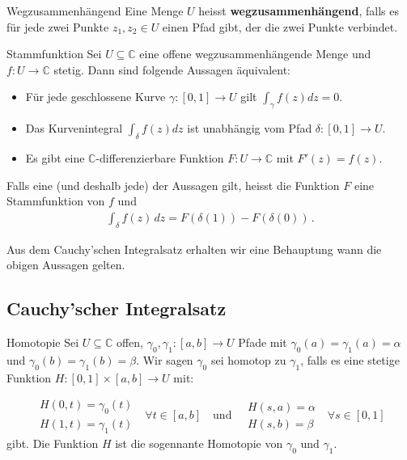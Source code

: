 \documentclass[a4paper,10pt]{article}
\begin{document}
\begin{mainbox}{Wegzusammenhängend}
  Eine Menge $U$ heisst \textbf{wegzusammenhängend}, falls es für jede zwei Punkte $z_1, z_2 \in U$ einen Pfad gibt, der die zwei Punkte verbindet.
\end{mainbox}

\begin{mainbox}{Stammfunktion}
  Sei \(U \subseteq \mathbb{C}\) eine offene wegzusammenhängende Menge und \(f \colon U \to \mathbb{C}\) stetig. Dann sind folgende Aussagen äquivalent:

  \begin{itemize}
    \item Für jede geschlossene Kurve \(\gamma \colon [0,1] \rightarrow U\) gilt \(\int_{\gamma} f(z) dz = 0\).
    \item Das Kurvenintegral \(\int_\delta f(z)dz\) ist unabhängig vom Pfad \(\delta\colon[0,1]\to U\).
    \item Es gibt eine \(\mathbb{C}\)-differenzierbare Funktion \(F \colon U \to \mathbb{C}\) mit \(F'(z)=f(z)\).
  \end{itemize}

Falls eine (und deshalb jede) der Aussagen gilt, heisst die Funktion \(F\) eine Stammfunktion von \(f\) und \begin{align*} \int_\delta f(z)\,dz=F(\delta(1))-F(\delta(0))\,. \end{align*}

\end{mainbox}

Aus dem Cauchy'schen Integralsatz erhalten wir eine Behauptung wann die obigen Aussagen gelten.

\subsection{Cauchy'scher Integralsatz}

\begin{subbox}{Homotopie}
  Sei \(U \subseteq \mathbb{C}\) offen, \(\gamma_0, \gamma_1: [a,b] \to U\) Pfade mit \(\gamma_0(a) = \gamma_1(a)=\alpha\) und \(\gamma_0(b) = \gamma_1(b)=\beta\). Wir sagen \(\gamma_0\) sei homotop zu \(\gamma_1\), falls es eine stetige Funktion \(H \colon [0,1]\times[a,b] \to U\) mit:
  
  \begin{equation*}
    \begin{matrix} H(0,t) = \gamma_0(t)\\ H(1,t) = \gamma_1(t) 
    \end{matrix} ~~~ \forall t \in [a,b] ~~~ \text{ und } ~~~ \begin{matrix} H(s,a)=\alpha\\ H(s,b) = \beta \end{matrix} ~~~ \forall s\in [0,1] \end{equation*} gibt. Die Funktion \(H\) ist die sogennante Homotopie von \(\gamma_0\) und \(\gamma_1\).

\end{subbox}
\end{document}
